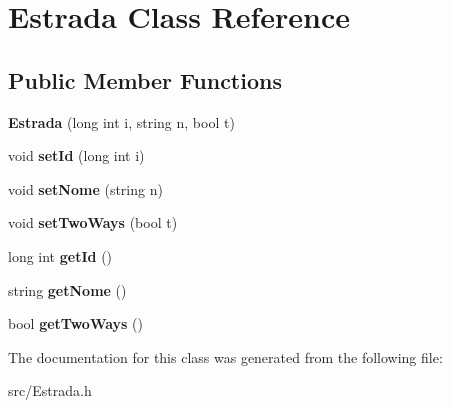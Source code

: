 \hypertarget{class_estrada}{}\section{Estrada Class Reference}
\label{class_estrada}
\subsection*{Public Member Functions}
\begin{DoxyCompactItemize}
\item 
\hypertarget{class_estrada_af2591cdf65861e697496f8cfd6902bc4}{}\label{class_estrada_af2591cdf65861e697496f8cfd6902bc4} 
{\bfseries Estrada} (long int i, string n, bool t)
\item 
\hypertarget{class_estrada_a7a9784c7ec0179de1835ac9d11905654}{}\label{class_estrada_a7a9784c7ec0179de1835ac9d11905654} 
void {\bfseries set\+Id} (long int i)
\item 
\hypertarget{class_estrada_af54c4c047302eebd6a10e15e17cdf819}{}\label{class_estrada_af54c4c047302eebd6a10e15e17cdf819} 
void {\bfseries set\+Nome} (string n)
\item 
\hypertarget{class_estrada_a9b0674665f843f1d92f2aa96c27399e6}{}\label{class_estrada_a9b0674665f843f1d92f2aa96c27399e6} 
void {\bfseries set\+Two\+Ways} (bool t)
\item 
\hypertarget{class_estrada_ad75540cf60d6da058c8dcbda00da71d6}{}\label{class_estrada_ad75540cf60d6da058c8dcbda00da71d6} 
long int {\bfseries get\+Id} ()
\item 
\hypertarget{class_estrada_a27f3aabb33557cef97b83e4cf346350a}{}\label{class_estrada_a27f3aabb33557cef97b83e4cf346350a} 
string {\bfseries get\+Nome} ()
\item 
\hypertarget{class_estrada_a6a9b86f891ba285256475babb902049e}{}\label{class_estrada_a6a9b86f891ba285256475babb902049e} 
bool {\bfseries get\+Two\+Ways} ()
\end{DoxyCompactItemize}


The documentation for this class was generated from the following file\+:\begin{DoxyCompactItemize}
\item 
src/Estrada.\+h\end{DoxyCompactItemize}
